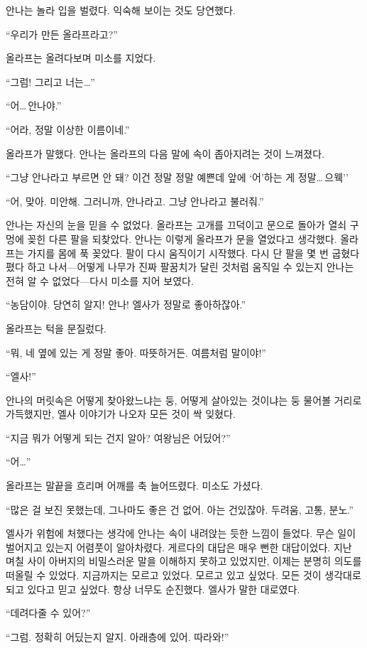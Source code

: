 안나는 놀라 입을 벌렸다. 익숙해 보이는 것도 당연했다.

``우리가 만든 올라프라고?''

올라프는 올려다보며 미소를 지었다.

``그럼! 그리고 너는\ldots''

``어\ldots\,안나야.''

``어라, 정말 이상한 이름이네.''

올라프가 말했다. 안나는 올라프의 다음 말에 속이 좁아지려는 것이 느껴졌다.

``그냥 안나라고 부르면 안 돼? 이건 정말 정말 예쁜데 앞에 `어'하는 게 정말\ldots\,으웩''

``어, 맞아. 미안해. 그러니까, 안나라고. 그냥 안나라고 불러줘.''

안나는 자신의 눈을 믿을 수 없었다. 올라프는 고개를 끄덕이고 문으로 돌아가 열쇠 구멍에 꽂힌 다른 팔을 되찾았다. 안나는 이렇게 올라프가 문을 열었다고 생각했다. 올라프는 가지를 몸에 푹 꽂았다. 팔이 다시 움직이기 시작했다. 다시 단 팔을 몇 번 굽혔다 폈다 하고 나서—어떻게 나무가 진짜 팔꿈치가 달린 것처럼 움직일 수 있는지 안나는 전혀 알 수 없었다—다시 미소를 지어 보였다.

``농담이야. 당연히 알지! 안나! 엘사가 정말로 좋아하잖아.''

올라프는 턱을 문질렀다.

``뭐, 네 옆에 있는 게 정말 좋아. 따뜻하거든. 여름처럼 말이야!''

``엘사!''

안나의 머릿속은 어떻게 찾아왔느냐는 둥, 어떻게 살아있는 것이냐는 둥 물어볼 거리로 가득했지만, 엘사 이야기가 나오자 모든 것이 싹 잊혔다.

``지금 뭐가 어떻게 되는 건지 알아? 여왕님은 어딨어?''

``어\ldots''

올라프는 말끝을 흐리며 어깨를 축 늘어뜨렸다. 미소도 가셨다.

``많은 걸 보진 못했는데, 그나마도 좋은 건 없어. 아는 건 있잖아. 두려움, 고통, 분노.''

엘사가 위험에 처했다는 생각에 안나는 속이 내려앉는 듯한 느낌이 들었다. 무슨 일이 벌어지고 있는지 어렴풋이 알아차렸다. 게르다의 대답은 매우 뻔한 대답이었다. 지난 며칠 사이 아버지의 비밀스러운 말을 이해하지 못하고 있었지만, 이제는 분명히 의도를 떠올릴 수 있었다. 지금까지는 모르고 있었다. 모르고 있고 싶었다. 모든 것이 생각대로 되고 있다고 믿고 싶었다. 항상 너무도 순진했다. 엘사가 말한 대로였다.

``데려다줄 수 있어?''

``그럼. 정확히 어딨는지 알지. 아래층에 있어. 따라와!''

